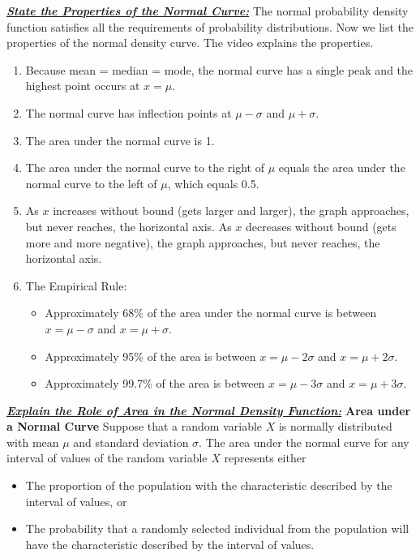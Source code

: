 \documentclass{report}
\begin{document}
    \pagebreak \bigbreak \noindent 
    \textbf{\textit{\underline{State the Properties of the Normal Curve:}}}
    \bigbreak \noindent 
    The normal probability density function satisfies all the requirements of probability distributions. Now we list the properties of the normal density curve. The video explains the properties.
    \begin{enumerate}
    \item Because mean = median = mode, the normal curve has a single peak and the highest point occurs at $x=\mu$.
    \item The normal curve has inflection points at $\mu-\sigma$ and $\mu+\sigma$.
    \item The area under the normal curve is 1.
    \item The area under the normal curve to the right of $\mu$ equals the area under the normal curve to the left of $\mu$, which equals 0.5.
    \item As $x$ increases without bound (gets larger and larger), the graph approaches, but never reaches, the horizontal axis. As $x$ decreases without bound (gets more and more negative), the graph approaches, but never reaches, the horizontal axis.
    \item The Empirical Rule:
    \begin{itemize}
        \item Approximately 68\% of the area under the normal curve is between $x=\mu-\sigma$ and $x=\mu+\sigma$.
        \item Approximately 95\% of the area is between $x=\mu-2\sigma$ and $x=\mu+2\sigma$.
        \item Approximately 99.7\% of the area is between $x=\mu-3\sigma$ and $x=\mu+3\sigma$.
    \end{itemize}
    \end{enumerate}

    \bigbreak \noindent \bigbreak \noindent 
    \textbf{\textit{\underline{Explain the Role of Area in the Normal Density Function:}}}
    \bigbreak \noindent 
    \textbf{Area under a Normal Curve}
    \bigbreak \noindent 
    Suppose that a random variable $X$ is normally distributed with mean $\mu$ and standard deviation $\sigma$. The area under the normal curve for any interval of values of the random variable $X$ represents either
    \bigbreak \noindent 
    \begin{itemize}
        \item The proportion of the population with the characteristic described by the interval of values,
        \smallbreak
        or
        \item The probability that a randomly selected individual from the population will have the characteristic described by the interval of values.
    \end{itemize}
\end{document}
